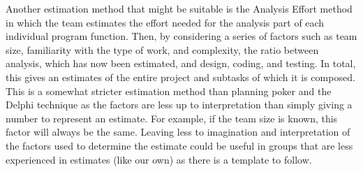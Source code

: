 Another estimation method that might be suitable is the Analysis Effort method \cite{caye} in which the team estimates the effort needed for the analysis part of each individual program function. Then, by considering a series of factors such as team size, familiarity with the type of work, and complexity, the ratio between analysis, which has now been estimated, and design, coding, and testing. In total, this gives an estimates of the entire project and subtasks of which it is composed. This is a somewhat stricter estimation method than planning poker and the Delphi technique as the factors are less up to interpretation than simply giving a number to represent an estimate. For example, if the team size is known, this factor will always be the same. Leaving less to imagination and interpretation of the factors used to determine the estimate could be useful in groups that are less experienced in estimates (like our own) as there is a template to follow.